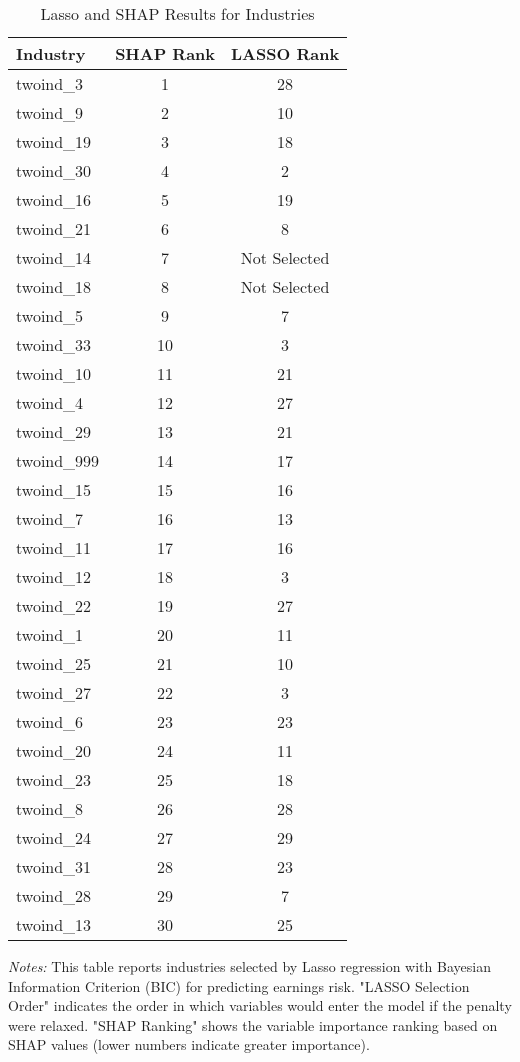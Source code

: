 \documentclass[12pt]{article}
\begin{document}
\begin{table}[H]
\centering

\caption{Lasso and SHAP Results for Industries}

\begin{tabular}{lcc}

\toprule
Industry & SHAP Rank & LASSO Rank\\
\midrule
twoind\_3 & 1 & 28 \\
twoind\_9 & 2 & 10 \\
twoind\_19 & 3 & 18 \\
twoind\_30 & 4 & 2 \\
twoind\_16 & 5 & 19 \\
twoind\_21 & 6 & 8 \\
twoind\_14 & 7 & Not Selected \\
twoind\_18 & 8 & Not Selected \\
twoind\_5 & 9 & 7 \\
twoind\_33 & 10 & 3 \\
twoind\_10 & 11 & 21 \\
twoind\_4 & 12 & 27 \\
twoind\_29 & 13 & 21 \\
twoind\_999 & 14 & 17 \\
twoind\_15 & 15 & 16 \\
twoind\_7 & 16 & 13 \\
twoind\_11 & 17 & 16 \\
twoind\_12 & 18 & 3 \\
twoind\_22 & 19 & 27 \\
twoind\_1 & 20 & 11 \\
twoind\_25 & 21 & 10 \\
twoind\_27 & 22 & 3 \\
twoind\_6 & 23 & 23 \\
twoind\_20 & 24 & 11 \\
twoind\_23 & 25 & 18 \\
twoind\_8 & 26 & 28 \\
twoind\_24 & 27 & 29 \\
twoind\_31 & 28 & 23 \\
twoind\_28 & 29 & 7 \\
twoind\_13 & 30 & 25 \\
\bottomrule
\end{tabular}%
\newline

\footnotesize
\textit{Notes:} This table reports industries selected by Lasso regression with Bayesian Information Criterion (BIC) for predicting earnings risk. "LASSO Selection Order" indicates the order in which variables would enter the model if the penalty were relaxed. "SHAP Ranking" shows the variable importance ranking based on SHAP values (lower numbers indicate greater importance).

\end{table}
\end{document}
